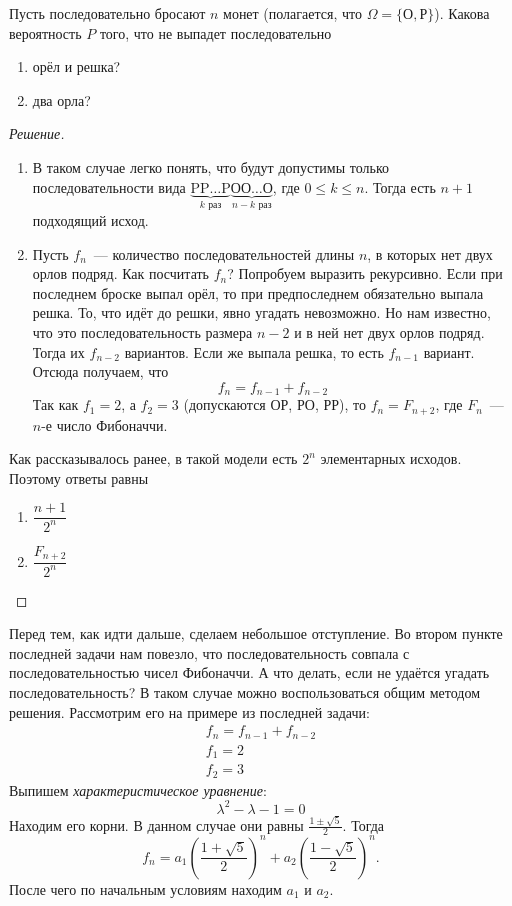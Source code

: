 \documentclass[a4paper,12pt]{article}
\begin{document}
\begin{problem}
	Пусть последовательно бросают \(n\) монет (полагается, что \(\Omega = \{\text{О}, \text{Р}\}\)). Какова вероятность \(P\) того, что не выпадет последовательно
	\begin{enumerate}
		\item орёл и решка?
		\item два орла?
	\end{enumerate}
\end{problem}
\begin{proof}[Решение]
	\begin{enumerate}
		\item В таком случае легко понять, что будут допустимы только последовательности вида \(\underbrace{\text{P}\text{P}\ldots\text{P}}_{k\text{ раз}}\underbrace{\text{О}\text{О}\ldots\text{О}}_{n - k\text{ раз}}\), где \(0 \leq k \leq n\). Тогда есть \(n + 1\) подходящий исход.
		
		\item Пусть \(f_n\)~--- количество последовательностей длины \(n\), в которых нет двух орлов подряд. Как посчитать \(f_n\)? Попробуем выразить рекурсивно. Если при последнем броске выпал орёл, то при предпоследнем обязательно выпала решка. То, что идёт до решки, явно угадать невозможно. Но нам известно, что это последовательность размера \(n - 2\) и в ней нет двух орлов подряд. Тогда их \(f_{n - 2}\) вариантов. Если же выпала решка, то есть \(f_{n - 1}\) вариант. Отсюда получаем, что \[f_{n} = f_{n - 1} + f_{n - 2}\]
		Так как \(f_1 = 2\), а \(f_2 = 3\) (допускаются ОР, РО, РР), то \(f_n = F_{n + 2}\), где \(F_n\)~--- \(n\)-е число Фибоначчи.
	\end{enumerate}
	Как рассказывалось ранее, в такой модели есть \(2^n\) элементарных исходов. Поэтому ответы равны
	\begin{enumerate}
		\item \(\dfrac{n + 1}{2^n}\)
		\item \(\dfrac{F_{n + 2}}{2^n}\)
	\end{enumerate}
\end{proof}

Перед тем, как идти дальше, сделаем небольшое отступление. Во втором пункте последней задачи нам повезло, что последовательность совпала с последовательностью чисел Фибоначчи. А что делать, если не удаётся угадать последовательность? В таком случае можно воспользоваться общим методом решения. Рассмотрим его на примере из последней задачи:
\[\begin{array}{l}
f_{n} = f_{n - 1} + f_{n - 2} \\
f_{1} = 2 \\
f_{2} = 3
\end{array}\]
Выпишем \emph{характеристическое уравнение}:
\[\lambda^2 - \lambda - 1 = 0\]
Находим его корни. В данном случае они равны \(\frac{1 \pm \sqrt{5}}{2}\). Тогда \[f_{n} = a_1\left(\frac{1 + \sqrt{5}}{2}\right)^n + a_2\left(\frac{1 - \sqrt{5}}{2}\right)^n.\]
После чего по начальным условиям находим \(a_1\) и \(a_2\).
\end{document}
